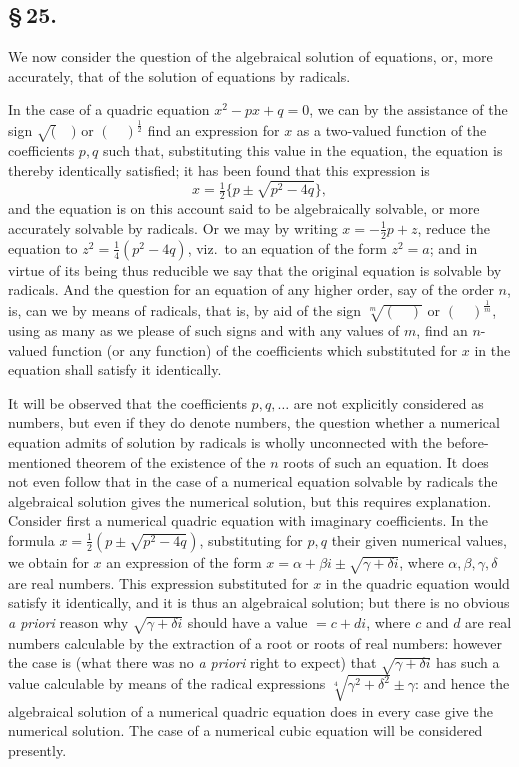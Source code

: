 \documentclass[11pt,a4paper]{article}
\begin{document}
\subsection*{\S\,25.}

We now consider the question of the algebraical solution of equations, or, more accurately, that of the solution of equations by radicals.

In the case of a quadric equation $x^{2} - px + q = 0$, we can by the assistance of the sign $\surd(\quad)$ or $(\quad)^{\frac{1}{2}}$ find an expression for $x$ as a two-valued function of the coefficients $p, q$ such that, substituting this value in the equation, the equation is thereby identically satisfied; it has been found that this expression is
\[
x = \tfrac{1}{2}\{p \pm \sqrt{p^{2} - 4q}\},
\]
and the equation is on this account said to be algebraically solvable, or more accurately solvable by radicals. Or we may by writing $x = -\frac{1}{2}p + z$, reduce the equation to $z^{2} = \frac{1}{4}(p^{2} - 4q)$, viz.\ to an equation of the form $z^{2} = a$; and in virtue of its being thus reducible we say that the original equation is solvable by radicals. And the question for an equation of any higher order, say of the order $n$, is, can we by means of radicals, that is, by aid of the sign $\sqrt[m]{(\quad)}$ or $(\quad)^{\frac{1}{m}}$, using as many as we please of such signs and with any values of $m$, find an $n$-valued function (or any function) of the coefficients which substituted for $x$ in the equation shall satisfy it identically.

It will be observed that the coefficients $p, q, \ldots$ are not explicitly considered as numbers, but even if they do denote numbers, the question whether a numerical equation admits of solution by radicals is wholly unconnected with the before-mentioned theorem of the existence of the $n$ roots of such an equation. It does not even follow that in the case of a numerical equation solvable by radicals the algebraical solution gives the numerical solution, but this requires explanation. Consider first a numerical quadric equation with imaginary coefficients. In the formula $x = \frac{1}{2}(p \pm \sqrt{p^{2} - 4q})$, substituting for $p, q$ their given numerical values, we obtain for $x$ an expression of the form $x = \alpha + \beta i \pm \sqrt{\gamma + \delta i}$, where $\alpha, \beta, \gamma, \delta$ are real numbers. This expression substituted for $x$ in the quadric equation would satisfy it identically, and it is thus an algebraical solution; but there is no obvious \textit{a priori} reason why $\sqrt{\gamma + \delta i}$ should have a value $= c + di$, where $c$ and $d$ are real numbers calculable by the extraction of a root or roots of real numbers: however the case is (what there was no \textit{a priori} right to expect) that $\sqrt{\gamma + \delta i}$ has such a value calculable by means of the radical expressions $\sqrt[4]{\gamma^{2} + \delta^{2}} \pm \gamma$: and hence the algebraical solution of a numerical quadric equation does in every case give the numerical solution. The case of a numerical cubic equation will be considered presently.
\end{document}
